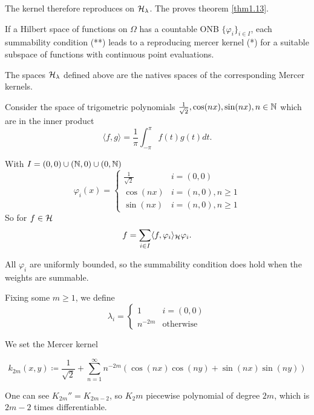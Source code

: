 The kernel therefore reproduces on $\mathcal{H}_\lambda$. The proves theorem \ref{thm1.13}.

If a Hilbert space of functions on $\Omega$ has a countable ONB $\{\varphi_i\}_{i\in I}$, each summability condition (**) leads to a reproducing mercer kernel (*) for a
suitable subspace of functions with continuous point evaluations.

\begin{corollary}\label{cor:1.14}
    The spaces $\mathcal{H}_\lambda$ defined above are the natives spaces of the corresponding
    Mercer kernels.
\end{corollary}

\begin{example}
    Consider the space of trigometric polynomials $\frac{1}{\sqrt{2}},\cos(nx),\sin(nx),n\in\mathbb{N}$ 
    which are  in the inner product
    \[\langle f,g\rangle=\frac{1}{\pi}\int_{-\pi}^{\pi} f(t)g(t)dt.\]

    With $I=(0,0)\cup (\mathbb{N},0)\cup(0,\mathbb{N})$
    \[\varphi_i(x)=\begin{cases}
        \frac{1}{\sqrt{2}} & i=(0,0)\\
        \cos(nx) & i=(n,0), n\geq 1\\
        \sin(nx) & i=(n,0), n\geq 1
    \end{cases}\]
    So for $f\in \mathcal{H}$
    \[f=\sum_{i\in I}\langle f,\varphi_i \rangle_{\mathcal{H}} \varphi_i.\]

    All $\varphi_i$ are uniformly bounded, so the summability condition does hold when the weights are summable.

    Fixing some $m\geq 1$, we define 
    \[\lambda_i=\begin{cases}
        1 & i=(0,0)\\
        n^{-2m} & \text{otherwise}
    \end{cases}\]

    We set the Mercer kernel
    
    \[k_{2m}(x,y)\coloneqq \frac{1}{\sqrt{2}}+\sum_{n=1}^\infty n^{-2m}(\cos(nx)\cos(ny)+\sin(nx)\sin(ny))\]

    One can see $K_{2m}''=K_{2m-2}$, so $K_2m$ piecewise polynomial of degree $2m$, which is 
    $2m-2$ times differentiable.



\end{example}

